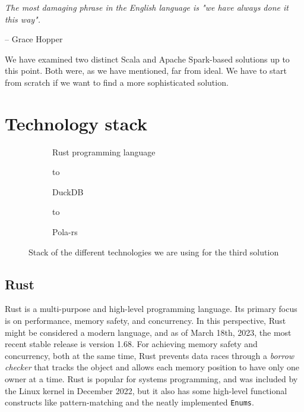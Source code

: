 \epigraph{\textit{The most damaging phrase in the English language is "we have always done it this way".}}{-- \textup{Grace Hopper}}

We have examined two distinct Scala and Apache Spark-based solutions up to this point. Both were, as we have mentioned, far from ideal. We have to start from scratch if we want to find a more sophisticated solution.

\section{Technology stack}

\begin{figure}[ht]
    \centering
    \newsavebox\mybox
    \begin{subfigure}{.3\textwidth}
        \centering
        \usebox{\mybox}
        \caption{Rust programming language}
    \end{subfigure}%
    \hspace*{0.1em}
    \begin{subfigure}{.3\textwidth}
        \centering
        \vbox to \ht{}
        \caption{DuckDB}
    \end{subfigure}%
    \hspace*{0.1em}
    \begin{subfigure}{.3\textwidth}
        \centering
        \vbox to \ht{}
        \caption{Pola-rs}
    \end{subfigure}%
    \caption{Stack of the different technologies we are using for the third solution}
\end{figure}

\label{section:rust}
\subsection{Rust}

Rust is a multi-purpose and high-level programming language. Its primary focus is on performance, memory safety, and concurrency. In this perspective, Rust might be considered a modern language, and as of March 18th, 2023, the most recent stable release is version 1.68. For achieving memory safety and concurrency, both at the same time, Rust prevents data races through a \textit{borrow checker} that tracks the object and allows each memory position to have only one owner at a time. Rust is popular for systems programming, and was included by the Linux kernel in December 2022, but it also has some high-level functional constructs like pattern-matching and the neatly implemented \texttt{Enums}.

